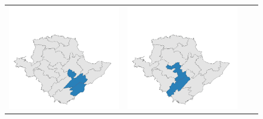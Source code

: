 \begin{figure}[p]
\begin{tabularx}{1\textwidth}{XXXX}
\includegraphics[width=1\linewidth]{images/ch6/mergeoverall/15}&
\includegraphics[width=1\linewidth]{images/ch6/mergeoverall/16} \\

\end{tabularx}
\end{figure}
